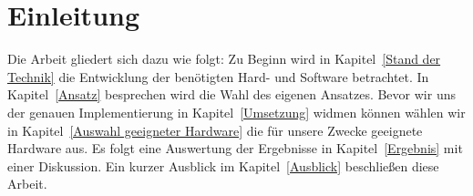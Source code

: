 
\chapter{Einleitung}\label{Einleitung}

\medskip
Die Arbeit gliedert sich dazu wie folgt: Zu Beginn wird in Kapitel~\ref{Stand der Technik} die Entwicklung der benötigten Hard- und Software betrachtet. In Kapitel~\ref{Ansatz} besprechen wird die Wahl des eigenen Ansatzes. Bevor wir uns der genauen Implementierung in Kapitel~\ref{Umsetzung} widmen können wählen wir in Kapitel~\ref{Auswahl geeigneter Hardware} die für unsere Zwecke geeignete Hardware aus. Es folgt eine Auswertung der Ergebnisse in Kapitel~\ref{Ergebnis} mit einer Diskussion. Ein kurzer Ausblick im
Kapitel~\ref{Ausblick} beschließen diese Arbeit.